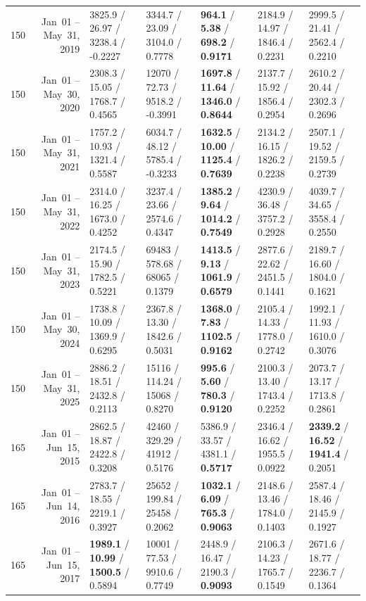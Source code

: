 \begin{longtable}{r r l l l l l}
150 & Jan~01 -- May~31, 2019 & 3825.9 / 26.97 / 3238.4 / -0.2227 & 3344.7 / 23.09 / 3104.0 / 0.7778 & \textbf{964.1} / \textbf{5.38} / \textbf{698.2} / \textbf{0.9171} & 2184.9 / 14.97 / 1846.4 / 0.2231 & 2999.5 / 21.41 / 2562.4 / 0.2210 \\
150 & Jan~01 -- May~30, 2020 & 2308.3 / 15.05 / 1768.7 / 0.4565 & 12070 / 72.73 / 9518.2 / -0.3991 & \textbf{1697.8} / \textbf{11.64} / \textbf{1346.0} / \textbf{0.8644} & 2137.7 / 15.92 / 1856.4 / 0.2954 & 2610.2 / 20.44 / 2302.3 / 0.2696 \\
150 & Jan~01 -- May~31, 2021 & 1757.2 / 10.93 / 1321.4 / 0.5587 & 6034.7 / 48.12 / 5785.4 / -0.3233 & \textbf{1632.5} / \textbf{10.00} / \textbf{1125.4} / \textbf{0.7639} & 2134.2 / 16.15 / 1826.2 / 0.2238 & 2507.1 / 19.52 / 2159.5 / 0.2739 \\
150 & Jan~01 -- May~31, 2022 & 2314.0 / 16.25 / 1673.0 / 0.4252 & 3237.4 / 23.66 / 2574.6 / 0.4347 & \textbf{1385.2} / \textbf{9.64} / \textbf{1014.2} / \textbf{0.7549} & 4230.9 / 36.48 / 3757.2 / 0.2928 & 4039.7 / 34.65 / 3558.4 / 0.2550 \\
150 & Jan~01 -- May~31, 2023 & 2174.5 / 15.90 / 1782.5 / 0.5221 & 69483 / 578.68 / 68065 / 0.1379 & \textbf{1413.5} / \textbf{9.13} / \textbf{1061.9} / \textbf{0.6579} & 2877.6 / 22.62 / 2451.5 / 0.1441 & 2189.7 / 16.60 / 1804.0 / 0.1621 \\
150 & Jan~01 -- May~30, 2024 & 1738.8 / 10.09 / 1369.9 / 0.6295 & 2367.8 / 13.30 / 1842.6 / 0.5031 & \textbf{1368.0} / \textbf{7.83} / \textbf{1102.5} / \textbf{0.9162} & 2105.4 / 14.33 / 1778.0 / 0.2742 & 1992.1 / 11.93 / 1610.0 / 0.3076 \\
150 & Jan~01 -- May~31, 2025 & 2886.2 / 18.51 / 2432.8 / 0.2113 & 15116 / 114.24 / 15068 / 0.8270 & \textbf{995.6} / \textbf{5.60} / \textbf{780.3} / \textbf{0.9120} & 2100.3 / 13.40 / 1743.4 / 0.2252 & 2073.7 / 13.17 / 1713.8 / 0.2861 \\
\midrule
165 & Jan~01 -- Jun~15, 2015 & 2862.5 / 18.87 / 2422.8 / 0.3208 & 42460 / 329.29 / 41912 / 0.5176 & 5386.9 / 33.57 / 4381.1 / \textbf{0.5717} & 2346.4 / 16.62 / 1955.5 / 0.0922 & \textbf{2339.2} / \textbf{16.52} / \textbf{1941.4} / 0.2051 \\
165 & Jan~01 -- Jun~14, 2016 & 2783.7 / 18.55 / 2219.1 / 0.3927 & 25652 / 199.84 / 25458 / 0.2062 & \textbf{1032.1} / \textbf{6.09} / \textbf{765.3} / \textbf{0.9063} & 2148.6 / 13.46 / 1784.0 / 0.1403 & 2587.4 / 18.46 / 2145.9 / 0.1927 \\
165 & Jan~01 -- Jun~15, 2017 & \textbf{1989.1} / \textbf{10.99} / \textbf{1500.5} / 0.5894 & 10001 / 77.53 / 9910.6 / 0.7749 & 2448.9 / 16.47 / 2190.3 / \textbf{0.9093} & 2106.3 / 14.23 / 1765.7 / 0.1549 & 2671.6 / 18.77 / 2236.7 / 0.1364 \\

\end{longtable}
